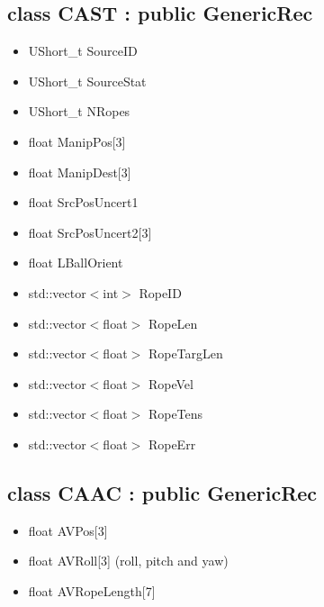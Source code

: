 \documentclass{article}
\begin{document}
\subsection{class CAST : public GenericRec}
\begin{itemize}
\item UShort\_t SourceID
\item UShort\_t SourceStat
\item UShort\_t NRopes
\item float ManipPos[3]
\item float ManipDest[3]
\item float SrcPosUncert1
\item float SrcPosUncert2[3]
\item float LBallOrient
\item std::vector$<$int$>$ RopeID
\item std::vector$<$float$>$ RopeLen
\item std::vector$<$float$>$ RopeTargLen
\item std::vector$<$float$>$ RopeVel
\item std::vector$<$float$>$ RopeTens
\item std::vector$<$float$>$ RopeErr
\end{itemize}

\subsection{class CAAC : public GenericRec}
\begin{itemize}
\item float AVPos[3]
\item float AVRoll[3] (roll, pitch and yaw)
\item float AVRopeLength[7]
\end{itemize}
\end{document}
